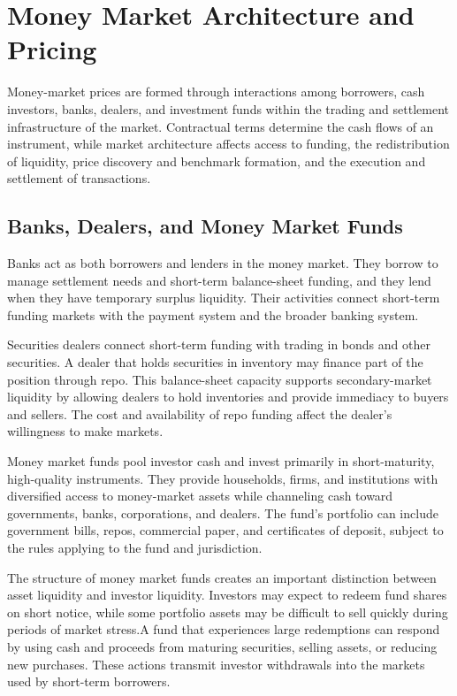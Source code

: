 \section{Money Market Architecture and Pricing}

Money-market prices are formed through interactions among borrowers, cash investors, banks, dealers, and investment funds within the trading and settlement infrastructure of the market. Contractual terms determine the cash flows of an instrument, while market architecture affects access to funding, the redistribution of liquidity, price discovery and benchmark formation, and the execution and settlement of transactions.

\subsection{Banks, Dealers, and Money Market Funds}

Banks act as both borrowers and lenders in the money market. They borrow to manage settlement needs and short-term balance-sheet funding, and they lend when they have temporary surplus liquidity. Their activities connect short-term funding markets with the payment system and the broader banking system.

Securities dealers connect short-term funding with trading in bonds and other securities. A dealer that holds securities in inventory may finance part of the position through repo. This balance-sheet capacity supports secondary-market liquidity by allowing dealers to hold inventories and provide immediacy to buyers and sellers. The cost and availability of repo funding affect the dealer's willingness to make markets.

Money market funds pool investor cash and invest primarily in short-maturity, high-quality instruments. They provide households, firms, and institutions with diversified access to money-market assets while channeling cash toward governments, banks, corporations, and dealers. The fund's portfolio can include government bills, repos, commercial paper, and certificates of deposit, subject to the rules applying to the fund and jurisdiction.

The structure of money market funds creates an
important distinction between asset liquidity and
investor liquidity. Investors may expect to redeem
fund shares on short notice, while some portfolio
assets may be difficult to sell quickly during
periods of market stress.A fund that experiences large redemptions can respond by using cash and proceeds from maturing securities, selling assets, or reducing new purchases. These actions transmit investor withdrawals into the markets used by short-term borrowers.

